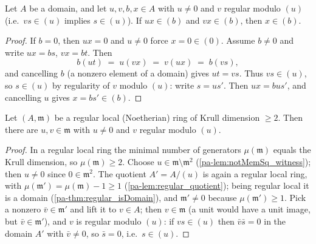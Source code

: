 \begin{lemma}
  \label{pa-lem:swap_lemma}
  \leanok

  Let \(A\) be a domain, and let \(u, v, b, x \in A\) with \(u \neq 0\) and
  \(v\) regular modulo \((u)\) (i.e.\ \(v s \in (u)\) implies \(s \in (u)\)).
  If \(u x \in (b)\) and \(v x \in (b)\), then \(x \in (b)\).
\end{lemma}
\begin{proof}
  \leanok
  If \(b = 0\), then \(u x = 0\) and \(u \neq 0\) force \(x = 0 \in (0)\).
  Assume \(b \neq 0\) and write \(u x = b s\), \(v x = b t\). Then
  \[
    b (u t) \;=\; u (v x) \;=\; v (u x) \;=\; b (v s),
  \]
  and cancelling \(b\) (a nonzero element of a domain) gives \(u t = v s\).
  Thus \(v s \in (u)\), so \(s \in (u)\) by regularity of \(v\) modulo
  \((u)\): write \(s = u s'\). Then \(u x = b u s'\), and cancelling \(u\)
  gives \(x = b s' \in (b)\).
\end{proof}

\begin{theorem}
  \label{pa-thm:swap_pair_exists}
  \leanok

  Let \((A, \mathfrak m)\) be a regular local (Noetherian) ring of Krull
  dimension \(\geq 2\). Then there are \(u, v \in \mathfrak m\) with
  \(u \neq 0\) and \(v\) regular modulo \((u)\).
\end{theorem}
\begin{proof}
  \leanok
  In a regular local ring the minimal number of generators
  \(\mu(\mathfrak m)\) equals the Krull dimension, so
  \(\mu(\mathfrak m) \geq 2\). Choose
  \(u \in \mathfrak m \setminus \mathfrak m^2\)
  (\ref{pa-lem:notMemSq_witness}); then \(u \neq 0\) since
  \(0 \in \mathfrak m^2\). The quotient \(A' = A/(u)\) is again a regular local
  ring, with \(\mu(\mathfrak m') = \mu(\mathfrak m) - 1 \geq 1\)
  (\ref{pa-lem:regular_quotient}); being regular local it is a domain
  (\ref{pa-thm:regular_isDomain}), and \(\mathfrak m' \neq 0\) because
  \(\mu(\mathfrak m') \geq 1\). Pick a nonzero \(\bar v \in \mathfrak m'\) and
  lift it to \(v \in A\); then \(v \in \mathfrak m\) (a unit would have a unit
  image, but \(\bar v \in \mathfrak m'\)), and \(v\) is regular modulo
  \((u)\): if \(v s \in (u)\) then \(\bar v \bar s = 0\) in the domain \(A'\)
  with \(\bar v \neq 0\), so \(\bar s = 0\), i.e.\ \(s \in (u)\).
\end{proof}

